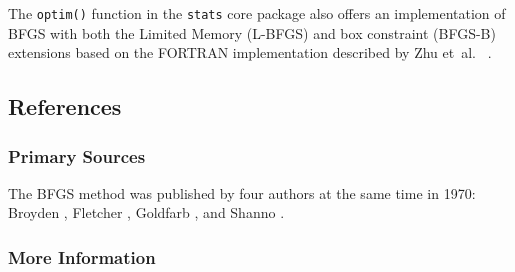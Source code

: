 The \texttt{optim()} function in the \texttt{stats} core package also offers an implementation of BFGS with both the Limited Memory (L-BFGS) and box constraint (BFGS-B) extensions based on the FORTRAN implementation described by Zhu et~al. \ \cite{Zhu1997}.

\subsection{References}

\subsubsection{Primary Sources}
The BFGS method was published by four authors at the same time in 1970: Broyden \cite{Broyden1970}, Fletcher \cite{Fletcher1970}, Goldfarb \cite{Goldfarb1970}, and Shanno \cite{Shanno1970}.

\subsubsection{More Information}




